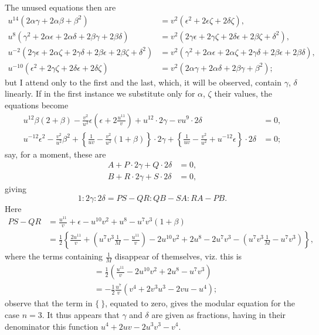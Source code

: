 \documentclass[12pt,a4paper]{article}
\begin{document}
The unused equations then are
\begin{align*}
u^{14}(2\alpha\gamma + 2\alpha\beta + \beta^2) &= v^2(\epsilon^2 + 2\epsilon\zeta + 2\delta\zeta), \\
u^8(\gamma^2 + 2\alpha\epsilon + 2\alpha\delta + 2\beta\gamma + 2\beta\delta)
&= v^2(2\gamma\epsilon + 2\gamma\zeta + 2\delta\epsilon + 2\beta\zeta + \delta^2), \\
u^{-2}(2\gamma\epsilon + 2\alpha\zeta + 2\gamma\delta + 2\beta\epsilon + 2\beta\zeta + \delta^2)
&= v^2(\gamma^2 + 2\alpha\epsilon + 2\alpha\zeta + 2\gamma\delta + 2\beta\epsilon + 2\beta\delta), \\
u^{-10}(\epsilon^2 + 2\gamma\zeta + 2\delta\epsilon + 2\delta\zeta)
&= v^2(2\alpha\gamma + 2\alpha\delta + 2\beta\gamma + \beta^2);
\end{align*}
but I attend only to the first and the last, which, it will be observed, contain $\gamma$, $\delta$ linearly. If in the first instance we substitute only for $\alpha$, $\zeta$ their values, the equations become
\begin{align*}
u^{12}\beta(2 + \beta) - \frac{v^2}{u^2}\epsilon\left(\epsilon + 2\frac{u^{11}}{v}\right) + u^{12} \cdot 2\gamma - vu^9 \cdot 2\delta &= 0, \\
u^{-12}\epsilon^2 - \frac{v^2}{u^2}\beta^2 + \left\{\frac{1}{uv} - \frac{v^2}{u^2}(1 + \beta)\right\} \cdot 2\gamma
+ \left\{\frac{1}{uv} - \frac{v^2}{u^2} + u^{-12}\epsilon\right\} \cdot 2\delta &= 0;
\end{align*}
say, for a moment, these are
\begin{align*}
A + P \cdot 2\gamma + Q \cdot 2\delta &= 0, \\
B + R \cdot 2\gamma + S \cdot 2\delta &= 0,
\end{align*}
giving
\[
1 : 2\gamma : 2\delta = PS - QR : QB - SA : RA - PB.
\]
Here
\begin{align*}
PS - QR &= \frac{u^{11}}{v} + \epsilon - u^{10}v^2 + u^8 - u^7 v^3(1 + \beta) \\
&= \tfrac{1}{2}\left\{\frac{2u^{11}}{v} + \left(u^7 v^3 \frac{1}{M} - \frac{u^{11}}{v}\right)
- 2u^{10}v^2 + 2u^8 - 2u^7 v^3 - \left(u^7 v^3 \frac{1}{M} - u^7 v^3\right)\right\},
\end{align*}
where the terms containing $\frac{1}{M}$ disappear of themselves, viz. this is
\begin{align*}
&= \tfrac{1}{2}\left(\frac{u^{11}}{v} - 2u^{10}v^2 + 2u^8 - u^7 v^3\right) \\
&= -\tfrac{1}{2}\frac{u^7}{v}(v^4 + 2v^3 u^3 - 2vu - u^4);
\end{align*}
observe that the term in $\{~\}$, equated to zero, gives the modular equation for the case $n = 3$. It thus appears that $\gamma$ and $\delta$ are given as fractions, having in their denominator this function $u^4 + 2uv - 2u^3 v^3 - v^4$.
\end{document}
